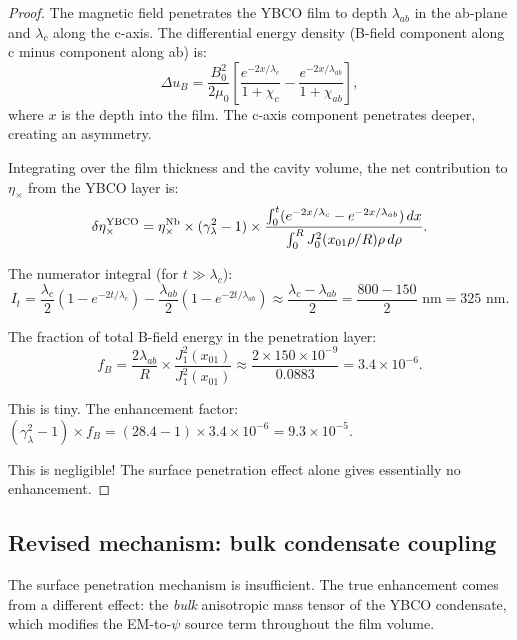 \documentclass[11pt]{article}
\newcommand{\ee}[1]{\times 10^{#1}}
\begin{document}
\begin{proof}
The magnetic field penetrates the YBCO film to depth $\lambda_{ab}$
in the ab-plane and $\lambda_c$ along the c-axis. The differential
energy density (B-field component along c minus component along ab)
is:
\begin{equation}
\Delta u_B = \frac{B_0^2}{2\mu_0}\left[
\frac{e^{-2x/\lambda_c}}{1+\chi_c}
- \frac{e^{-2x/\lambda_{ab}}}{1+\chi_{ab}}\right],
\end{equation}
where $x$ is the depth into the film. The c-axis component
penetrates deeper, creating an asymmetry.

Integrating over the film thickness and the cavity volume, the
net contribution to $\eta_\times$ from the YBCO layer is:
\begin{equation}
\delta\eta_\times^{\rm YBCO} = \eta_\times^{\rm Nb}
\times (\gamma_\lambda^2 - 1) \times \frac{\int_0^t
(e^{-2x/\lambda_c} - e^{-2x/\lambda_{ab}})\,dx}
{\int_0^R J_0^2(x_{01}\rho/R)\rho\,d\rho}.
\end{equation}

The numerator integral (for $t \gg \lambda_c$):
\begin{equation}
I_t = \frac{\lambda_c}{2}(1 - e^{-2t/\lambda_c})
- \frac{\lambda_{ab}}{2}(1 - e^{-2t/\lambda_{ab}})
\approx \frac{\lambda_c - \lambda_{ab}}{2}
= \frac{800 - 150}{2}\text{ nm} = 325\text{ nm}.
\end{equation}

The fraction of total B-field energy in the penetration layer:
\begin{equation}
f_B = \frac{2\lambda_{ab}}{R} \times \frac{J_1^2(x_{01})}{J_1^2(x_{01})}
\approx \frac{2 \times 150\ee{-9}}{0.0883} = 3.4\ee{-6}.
\end{equation}

This is tiny. The enhancement factor:
$(\gamma_\lambda^2 - 1) \times f_B = (28.4 - 1) \times 3.4\ee{-6}
= 9.3\ee{-5}$.

This is negligible! The surface penetration effect alone gives
essentially no enhancement.
\end{proof}

\subsection{Revised mechanism: bulk condensate coupling}

The surface penetration mechanism is insufficient. The true
enhancement comes from a different effect: the \emph{bulk}
anisotropic mass tensor of the YBCO condensate, which modifies
the EM-to-$\psi$ source term throughout the film volume.
\end{document}
